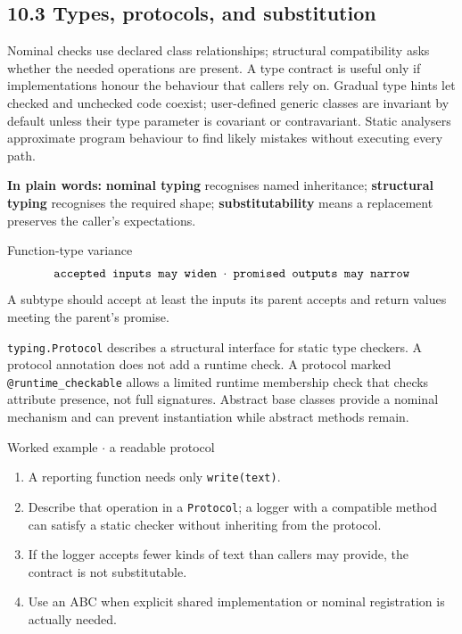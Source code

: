 \documentclass[11pt]{article}
\begin{document}
\begin{keepsection}
\section{10.3 Types, protocols, and substitution}

Nominal checks use declared class relationships; structural compatibility asks whether the needed operations are present. A type contract is useful only if implementations honour the behaviour that callers rely on. Gradual type hints let checked and unchecked code coexist; user-defined generic classes are invariant by default unless their type parameter is covariant or contravariant. Static analysers approximate program behaviour to find likely mistakes without executing every path.

\begin{plainbox}\textbf{In plain words:} \textbf{nominal typing} recognises named inheritance; \textbf{structural typing} recognises the required shape; \textbf{substitutability} means a replacement preserves the caller’s expectations.\end{plainbox}

\begin{equationcard}{Function-type variance}
\[ \begin{gathered} \texttt{accepted inputs may widen \ensuremath{\cdot} promised outputs may narrow} \end{gathered} \]
{\small A subtype should accept at least the inputs its parent accepts and return values meeting the parent’s promise.}
\end{equationcard}

\texttt{typing.Protocol} describes a structural interface for static type checkers. A protocol annotation does not add a runtime check. A protocol marked \texttt{@runtime\_checkable} allows a limited runtime membership check that checks attribute presence, not full signatures. Abstract base classes provide a nominal mechanism and can prevent instantiation while abstract methods remain.

\begin{workedbox}{Worked example \ensuremath{\cdot} a readable protocol}
\begin{enumerate}
\item A reporting function needs only \texttt{write(text)}.
\item Describe that operation in a \texttt{Protocol}; a logger with a compatible method can satisfy a static checker without inheriting from the protocol.
\item If the logger accepts fewer kinds of text than callers may provide, the contract is not substitutable.
\item Use an ABC when explicit shared implementation or nominal registration is actually needed.
\end{enumerate}
\end{workedbox}


\end{keepsection}
\end{document}
